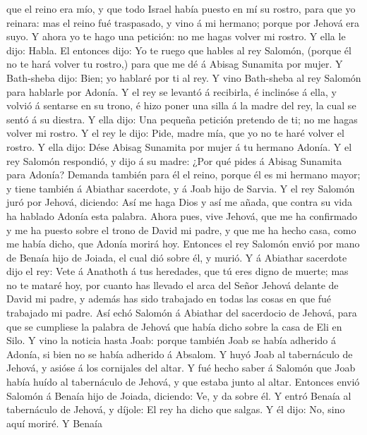 que el reino era mío, y que todo Israel había puesto en mí su rostro,
para que yo reinara: mas el reino fué traspasado, y vino á mi hermano;
porque por Jehová era suyo.  Y ahora yo te hago una
petición: no me hagas volver mi rostro. Y ella le dijo: Habla.
 El entonces dijo: Yo te ruego que hables al rey Salomón,
(porque él no te hará volver tu rostro,) para que me dé á Abisag
Sunamita por mujer.  Y Bath-sheba dijo: Bien; yo hablaré
por ti al rey.  Y vino Bath-sheba al rey Salomón para
hablarle por Adonía. Y el rey se levantó á recibirla, é inclinóse á
ella, y volvió á sentarse en su trono, é hizo poner una silla á la madre
del rey, la cual se sentó á su diestra.  Y ella dijo: Una
pequeña petición pretendo de ti; no me hagas volver mi rostro. Y el rey
le dijo: Pide, madre mía, que yo no te haré volver el rostro.
 Y ella dijo: Dése Abisag Sunamita por mujer á tu hermano
Adonía.  Y el rey Salomón respondió, y dijo á su madre:
¿Por qué pides á Abisag Sunamita para Adonía? Demanda también para él el
reino, porque él es mi hermano mayor; y tiene también á Abiathar
sacerdote, y á Joab hijo de Sarvia.  Y el rey Salomón
juró por Jehová, diciendo: Así me haga Dios y así me añada, que contra
su vida ha hablado Adonía esta palabra.  Ahora pues, vive
Jehová, que me ha confirmado y me ha puesto sobre el trono de David mi
padre, y que me ha hecho casa, como me había dicho, que Adonía morirá
hoy.  Entonces el rey Salomón envió por mano de Benaía
hijo de Joiada, el cual dió sobre él, y murió.  Y á
Abiathar sacerdote dijo el rey: Vete á Anathoth á tus heredades, que tú
eres digno de muerte; mas no te mataré hoy, por cuanto has llevado el
arca del Señor Jehová delante de David mi padre, y además has sido
trabajado en todas las cosas en que fué trabajado mi padre.
 Así echó Salomón á Abiathar del sacerdocio de Jehová,
para que se cumpliese la palabra de Jehová que había dicho sobre la casa
de Eli en Silo.  Y vino la noticia hasta Joab: porque
también Joab se había adherido á Adonía, si bien no se había adherido á
Absalom. Y huyó Joab al tabernáculo de Jehová, y asióse á los cornijales
del altar.  Y fué hecho saber á Salomón que Joab había
huído al tabernáculo de Jehová, y que estaba junto al altar. Entonces
envió Salomón á Benaía hijo de Joiada, diciendo: Ve, y da sobre él.
 Y entró Benaía al tabernáculo de Jehová, y díjole: El
rey ha dicho que salgas. Y él dijo: No, sino aquí moriré. Y Benaía
